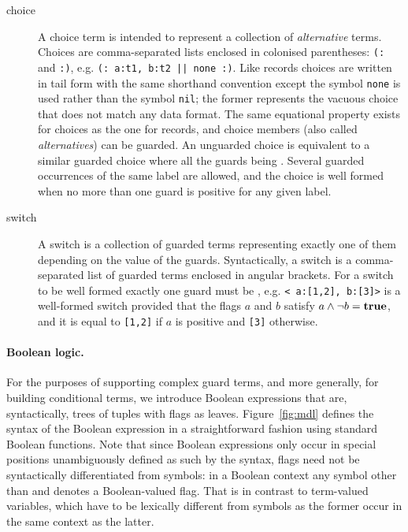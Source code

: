 \documentclass[11pt]{report}
\begin{document}
\begin{description}
\item[choice] A choice term is intended to represent a collection of {\em alternative} terms.
Choices are comma-separated lists enclosed in colonised parentheses: \verb"(:" and \verb":)", e.g.
\verb"(: a:t1, b:t2 || none :)".
Like records choices are written in tail form with the same shorthand convention except the symbol \verb$none$ is used rather than the symbol \verb$nil$; the former represents the vacuous choice
that does not match any data format. The same equational property exists for
choices as the one for records, and choice members (also called {\em alternatives}) can be
guarded. An unguarded choice is equivalent to a similar guarded choice where all the guards being \true{}. Several guarded occurrences of the same label are allowed, and the choice is well formed when no more than one guard is positive for any given label.

\item[switch] A switch is a collection of guarded terms representing exactly one of them depending on the value of the 
guards. Syntactically, a switch is a comma-separated list of guarded terms enclosed in angular brackets. For a switch
to be well formed exactly one guard must be \true, e.g. \verb"< a:[1,2], b:[3]>" is a well-formed switch provided 
that the flags $a$ and $b$ satisfy  $a\wedge \neg b=\hbox{\bf true}$, and it is equal to \verb$[1,2]$ if $a$ is positive and \verb$[3]$ 
otherwise.

\end{description}

\paragraph{Boolean logic.} For the purposes of supporting complex guard terms, and more generally, for building conditional terms,  we introduce Boolean expressions that are, syntactically, trees of tuples with flags as leaves. Figure~\ref{fig:mdl}
defines the syntax of the Boolean expression in a straightforward fashion using standard Boolean functions. Note that 
since Boolean expressions only occur in special positions unambiguously defined as such by the syntax, flags need 
not be syntactically differentiated from symbols: in a Boolean context any symbol other than \true and \false denotes
a Boolean-valued flag. That is in contrast to term-valued variables, which have to be lexically different from symbols
as the former occur in the same context as the latter. 
\end{document}
